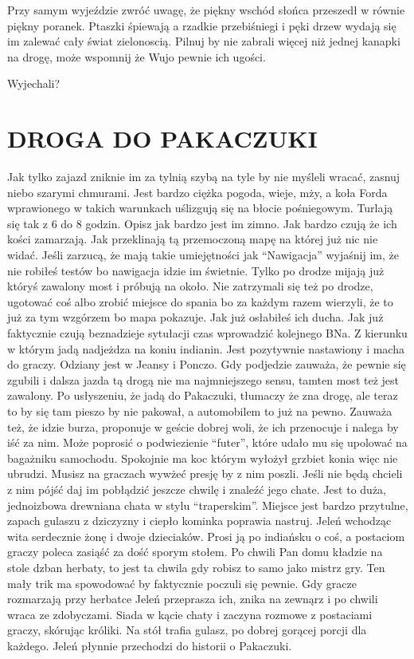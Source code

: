 \documentclass[ms,a4paper]{memoir}
\newcommand{\RED}[1]{\textcolor{red!50!black}{\MakeUppercase{#1}}}
\begin{document}
Przy samym wyjeździe zwróć uwagę, że piękny wschód słońca przeszedł w równie piękny poranek.
Ptaszki śpiewają a rzadkie przebiśniegi i pęki drzew wydają się im zalewać cały świat zielonoscią.
Pilnuj by nie zabrali więcej niż jednej kanapki na drogę, może wspomnij że Wujo pewnie ich ugości.

Wyjechali?
\chapter{\RED{Droga do Pakaczuki}}

Jak tylko zajazd zniknie im za tylnią szybą na tyle by nie myśleli wracać, zasnuj niebo szarymi chmurami.
Jest bardzo ciężka pogoda, wieje, mży, a koła Forda wprawionego w takich warunkach uślizgują się na błocie pośniegowym.
Turlają się tak z 6 do 8 godzin.
Opisz jak bardzo jest im zimno.
Jak bardzo czują że ich kości zamarzają.
Jak przeklinają tą przemoczoną mapę na której już nic nie widać.
Jeśli zarzucą, że mają takie umiejętności jak ``Nawigacja'' wyjaśnij im, że nie robiłeś testów bo nawigacja idzie im świetnie.
Tylko po drodze mijają już któryś zawalony most i próbują na około.
Nie zatrzymali się też po drodze, ugotować coś albo zrobić miejsce do spania bo za każdym razem wierzyli, że to już za tym wzgórzem bo mapa pokazuje.
Jak już osłabiłeś ich ducha.
Jak już faktycznie czują beznadzieje sytułacji czas wprowadzić kolejnego BNa.
Z kierunku w którym jadą nadjeżdza na koniu indianin.
Jest pozytywnie nastawiony i macha do graczy.
Odziany jest w Jeansy i Ponczo.
Gdy podjedzie zauważa, że pewnie się zgubili i dalsza jazda tą drogą nie ma najmniejszego sensu, tamten most też jest zawalony.
Po usłyszeniu, że jadą do Pakaczuki, tłumaczy że zna drogę, ale teraz to by się tam pieszo by nie pakował, a automobilem to już na pewno.
Zauważa też, że idzie burza, proponuje w geście dobrej woli, że ich przenocuje i nalega by iść za nim.
Może poprosić o podwiezienie ``futer'', które udało mu się upolować na bagażniku samochodu.
Spokojnie ma koc którym wyłożył grzbiet konia więc nie ubrudzi.
Musisz na graczach wywżeć presję by z nim poszli.
Jeśli nie będą chcieli z nim pójść daj im pobłądzić jeszcze chwilę i znaleźć jego chate.
Jest to duża, jednoizbowa drewniana chata w stylu ``traperskim''.
Miejsce jest bardzo przytulne, zapach gulaszu z dziczyzny i ciepło kominka poprawia nastruj.
Jeleń wchodząc wita serdecznie żonę i dwoje dzieciaków.
Prosi ją po indiańsku o coś, a postaciom graczy poleca zasiąść za dość sporym stołem.
Po chwili Pan domu kładzie na stole dzban herbaty, to jest ta chwila gdy robisz to samo jako mistrz gry.
Ten mały trik ma spowodować by faktycznie poczuli się pewnie.
Gdy gracze rozmarzają przy herbatce Jeleń przeprasza ich, znika na zewnąrz i po chwili wraca ze zdobyczami.
Siada w kącie chaty i zaczyna rozmowe z postaciami graczy, skórując króliki.
Na stół trafia gulasz, po dobrej gorącej porcji dla każdego.
Jeleń płynnie przechodzi do historii o Pakaczuki.


\end{document}
